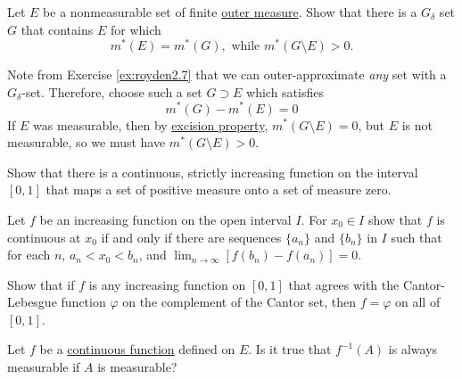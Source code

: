   \begin{exercise}[Royden 2.33]
    Let $E$ be a nonmeasurable set of finite \hyperref[def:outer-measure]{outer measure}. Show that there is a $G_{\delta}$ set $G$ that contains $E$ for which
    \begin{equation*}
      m^{\ast}(E) = m^{\ast}(G), \text{ while } m^{\ast}(G \setminus E) > 0.
    \end{equation*}
  \end{exercise}
  \begin{solution}
    Note from Exercise \ref{ex:royden2.7} that we can outer-approximate \textit{any} set with a $G_\delta$-set. Therefore, choose such a set $G \supset E$ which satisfies 
    \begin{equation}
      m^\ast (G) - m^\ast (E) = 0 
    \end{equation}
    If $E$ was measurable, then by \hyperref[thm:excision-property]{excision property}, $m^\ast(G \setminus E) = 0$, but $E$ is not measurable, so we must have $m^\ast(G \setminus E) > 0$. 
  \end{solution}

  \begin{exercise}[Royden 2.34]
    Show that there is a continuous, strictly increasing function on the interval $[0, 1]$ that maps a set of positive measure onto a set of measure zero.
  \end{exercise}

  \begin{exercise}[Royden 2.35]
    Let $f$ be an increasing function on the open interval $I$. For $x_0 \in I$ show that $f$ is continuous at $x_0$ if and only if there are sequences $\{a_n\}$ and $\{b_n\}$ in $I$ such that for each $n$, $a_n < x_0 < b_n$, and $\lim_{n \to \infty}[f(b_n) - f(a_n)] = 0$.
  \end{exercise}

  \begin{exercise}[Royden 2.36]
    Show that if $f$ is any increasing function on $[0, 1]$ that agrees with the Cantor-Lebesgue function $\varphi$ on the complement of the Cantor set, then $f = \varphi$ on all of $[0, 1]$.
  \end{exercise}

  \begin{exercise}[Royden 2.37]
    Let $f$ be a \hyperref[pst-def:continuous_func]{continuous function} defined on $E$. Is it true that $f^{-1}(A)$ is always measurable if $A$ is measurable?
  \end{exercise}

